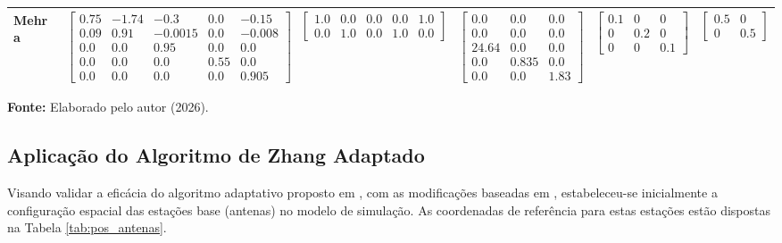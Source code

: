 \documentclass[journal]{IEEEtran}
\begin{document}
\begin{table}[htbp]
{\begin{tabular}{@{}lccccc@{}}
        Mehra  \cite{Mehra1970} & 
        $ \begin{bmatrix} 0.75 & -1.74 & -0.3 & 0.0 & -0.15 \\ 0.09 & 0.91 & -0.0015 & 0.0 & -0.008 \\ 0.0 & 0.0 & 0.95 & 0.0 & 0.0 \\ 0.0 & 0.0 & 0.0 & 0.55 & 0.0 \\ 0.0 & 0.0 & 0.0 & 0.0 & 0.905 \end{bmatrix} $ & 
        $ \begin{bmatrix} 1.0 & 0.0 & 0.0 & 0.0 & 1.0 \\ 0.0 & 1.0 & 0.0 & 1.0 & 0.0 \end{bmatrix} $ & 
        $ \begin{bmatrix} 0.0 & 0.0 & 0.0 \\ 0.0 & 0.0 & 0.0 \\ 24.64 & 0.0 & 0.0 \\ 0.0 & 0.835 & 0.0 \\ 0.0 & 0.0 & 1.83 \end{bmatrix} $ & 
        $ \begin{bmatrix} 0.1 & 0 & 0 \\ 0 & 0.2 & 0 \\ 0 & 0 & 0.1 \end{bmatrix} $ & 
        $ \begin{bmatrix} 0.5    & 0 \\ 0 & 0.5 \end{bmatrix} $ \\ \bottomrule
    \end{tabular}%
    }
    \vspace{1pt}
    \centerline{\footnotesize \textbf{Fonte:} Elaborado pelo autor (2026).}
\end{table}
    
\subsection{Aplicação do Algoritmo de Zhang Adaptado}


Visando validar a eficácia do algoritmo adaptativo proposto em \cite{zhang2020}, com as modificações baseadas em \cite{falek2020}, estabeleceu-se inicialmente a configuração espacial das estações base (antenas) no modelo de simulação. As coordenadas de referência para estas estações estão dispostas na Tabela \ref{tab:pos_antenas}.
\end{document}
